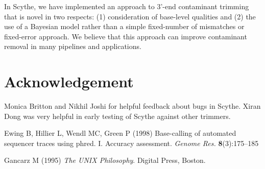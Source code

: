 \documentclass{bioinfo}
\begin{document}
In Scythe, we have implemented an approach to 3'-end contaminant
trimming that is novel in two respects: (1) consideration of
base-level qualities and (2) the use of a Bayesian model rather than a
simple fixed-number of mismatches or fixed-error approach. We believe
that this approach can improve contaminant removal in many pipelines
and applications.


\section*{Acknowledgement}
Monica Britton and Nikhil Joshi for helpful feedback about bugs in
Scythe. Xiran Dong was very helpful in early testing of Scythe against
other trimmers.



% 
% 
% 
% 
% 

\begin{thebibliography}{}
Ewing B, Hillier L, Wendl MC, Green P (1998) Base-calling of automated sequencer traces using phred. I. Accuracy assessment. \textit{Genome Res.} \textbf{8}(3):175--185

Gancarz M (1995) \textit{The UNIX Philosophy}. Digital Press, Boston.

\end{thebibliography}
\end{document}

